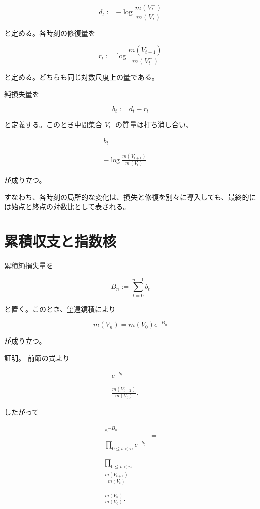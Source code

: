 \documentclass[12pt,a4paper]{article}
\begin{document}
\[
d_{t} := -\log \frac{m(V_{t}^-)}{m(V_{t})}
\]

と定める。各時刻の修復量を

\[
r_{t} := \log \frac{m(V_{t+1})}{m(V_{t}^-)}
\]

と定める。どちらも同じ対数尺度上の量である。

純損失量を

\[
b_{t} := d_{t}-r_{t}
\]

と定義する。このとき中間集合 \(V_{t}^-\) の質量は打ち消し合い、

\[
\begin{aligned}
b_{t} \\
&= \\
-\log \frac{m(V_{t+1})}{m(V_{t})}
\end{aligned}
\]

が成り立つ。

すなわち、各時刻の局所的な変化は、損失と修復を別々に導入しても、最終的には始点と終点の対数比として表される。

\section{累積収支と指数核}\label{ux7d2fux7a4dux53ceux652fux3068ux6307ux6570ux6838}

累積純損失量を

\[
B_{n} := \sum_{t=0}^{n-1} b_{t}
\]

と置く。このとき、望遠鏡積により

\[
m(V_{n}) = m(V_0) e^{-B_{n}}
\]

が成り立つ。

証明。 前節の式より

\[
\begin{aligned}
e^{-b_{t}} \\
&= \\
\frac{m(V_{t+1})}{m(V_{t})}.
\end{aligned}
\]

したがって

\[
\begin{aligned}
e^{-B_{n}} \\
&= \\
\prod_{0\le t<n} e^{-b_{t}} \\
&= \\
\prod_{0\le t<n} \\
\frac{m(V_{t+1})}{m(V_{t})} \\
&= \\
\frac{m(V_{n})}{m(V_0)}.
\end{aligned}
\]
\end{document}
